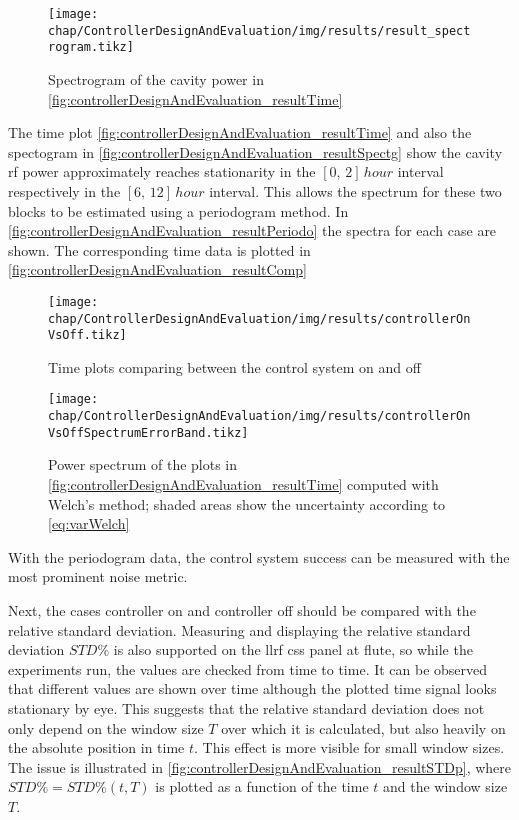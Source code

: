 \begin{figure}[tb]
	\centering
	\texttt{[image: chap/ControllerDesignAndEvaluation/img/results/result\_spectrogram.tikz]}
	\caption{Spectrogram of the cavity power in \autoref{fig:controllerDesignAndEvaluation_resultTime}}
	\label{fig:controllerDesignAndEvaluation_resultSpectg}
\end{figure}

The time plot \autoref{fig:controllerDesignAndEvaluation_resultTime} and also the spectogram in \autoref{fig:controllerDesignAndEvaluation_resultSpectg} show the cavity \gls{rf} power approximately reaches stationarity in the $[0,\,2]\,\si{hour}$ interval respectively in the $[6,\,12]\, \si{hour}$ interval.
This allows the spectrum for these two blocks to be estimated using a periodogram method. In \autoref{fig:controllerDesignAndEvaluation_resultPeriodo} the spectra for each case are shown. The corresponding time data is plotted in \autoref{fig:controllerDesignAndEvaluation_resultComp}

\begin{figure}[tb]
	\centering
	\texttt{[image: chap/ControllerDesignAndEvaluation/img/results/controllerOnVsOff.tikz]}
	\caption{Time plots comparing between the control system on and off}
	\label{fig:controllerDesignAndEvaluation_resultComp}
\end{figure}

\begin{figure}[tb]
	\centering
	\texttt{[image: chap/ControllerDesignAndEvaluation/img/results/controllerOnVsOffSpectrumErrorBand.tikz]}
	\caption{Power spectrum of the plots in \autoref{fig:controllerDesignAndEvaluation_resultTime} computed with Welch's method; shaded areas show the uncertainty according to \autoref{eq:varWelch}}
	\label{fig:controllerDesignAndEvaluation_resultPeriodo}
\end{figure}

With the periodogram data, the control system success can be measured with the most prominent noise metric.

Next, the cases controller on and controller off should be compared with the relative standard deviation. Measuring and displaying the relative standard deviation $STD\%$ is also supported on the \gls{llrf} \gls{css} panel at \gls{flute}, so while the experiments run, the values are checked from time to time. It can be observed that different values are shown over time although the plotted time signal looks stationary by eye. This suggests that the relative standard deviation does not only depend on the window size $T$ over which it is calculated, but also heavily on the absolute position in time $t$. This effect is more visible for small window sizes. The issue is illustrated in \autoref{fig:controllerDesignAndEvaluation_resultSTDp}, where $STD\%=STD\%(t,T)$ is plotted as a function of the time $t$ and the window size $T$.

